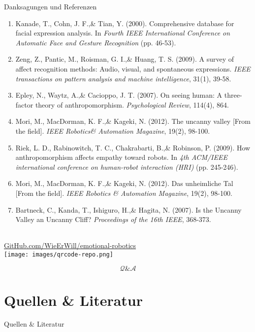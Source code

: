 \documentclass[aspectratio=169]{beamer}
\begin{document}
\begin{frame}{Danksagungen und Referenzen}
\begin{enumerate}
      \item Kanade, T., Cohn, J. F.,\& Tian, Y. (2000). Comprehensive database for facial expression analysis. In \textit{Fourth IEEE International Conference on Automatic Face and Gesture Recognition} (pp. 46-53).
      \item Zeng, Z., Pantic, M., Roisman, G. I.,\& Huang, T. S. (2009). A survey of affect recognition methods: Audio, visual, and spontaneous expressions. \textit{IEEE transactions on pattern analysis and machine intelligence}, 31(1), 39-58.
      \item Epley, N., Waytz, A.,\& Cacioppo, J. T. (2007). On seeing human: A three-factor theory of anthropomorphism. \textit{Psychological Review}, 114(4), 864.
      \item Mori, M., MacDorman, K. F.,\& Kageki, N. (2012). The uncanny valley [From the field]. \textit{IEEE Robotics\& Automation Magazine}, 19(2), 98-100.
      \item Riek, L. D., Rabinowitch, T. C., Chakrabarti, B.,\& Robinson, P. (2009). How anthropomorphism affects empathy toward robots. In \textit{4th ACM/IEEE international conference on human-robot interaction (HRI)} (pp. 245-246).
      \item Mori, M., MacDorman, K. F.,\& Kageki, N. (2012). Das unheimliche Tal [From the field]. \textit{IEEE Robotics \& Automation Magazine}, 19(2), 98-100.
      \item Bartneck, C., Kanda, T., Ishiguro, H.,\& Hagita, N. (2007). Is the Uncanny Valley an Uncanny Cliff? \textit{Proceedings of the 16th IEEE}, 368-373.
  \end{enumerate}
\end{frame}

\begin{frame}[c]{}
  \centering
  \begin{minipage}{\textwidth}
    \centering
    \Large {}\\
    \href{https://github.com/wieerwill/emotional-robotics}{GitHub.com/WieErWill/emotional-robotics}\\
    \vspace{.4cm}
    \texttt{[image: images/qrcode-repo.png]}
  \end{minipage}
\end{frame}

\begin{frame}[c]{}
  \centering
  \begin{minipage}{\textwidth}
    \centering
    \Huge \[\mathcal Q \& \mathcal A\]
    \Large {}
  \end{minipage}
\end{frame}

\section{Quellen \& Literatur}
\begin{frame}[allowframebreaks]{Quellen \& Literatur}
  \scriptsize
  
  
\end{frame}
\end{document}
